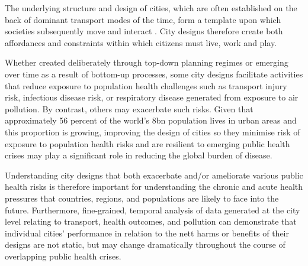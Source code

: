 \documentclass[preprint,12pt]{elsarticle}
\begin{document}
\begin{frontmatter}





\end{frontmatter}




The underlying structure and design of cities, which are often established on the back of dominant transport modes of the time, form a template upon which societies subsequently move and interact \cite{Thompson2020}. City designs therefore create both affordances and constraints within which citizens must live, work and play.

Whether created deliberately through top-down planning regimes \cite{mundigo1977city} or emerging over time as a result of bottom-up processes, some city designs facilitate activities that reduce exposure to population health challenges such as transport injury risk, infectious disease risk, or respiratory disease generated from exposure to air pollution. By contrast, others may exacerbate such risks. Given that approximately 56 percent of the world's 8bn population lives in urban areas and this proportion is growing, improving the design of cities so they minimise risk of exposure to population health risks and are resilient to emerging public health crises may play a significant role in reducing the global burden of disease.   

Understanding city designs that both exacerbate and/or ameliorate various public health risks is therefore important for understanding the chronic and acute health pressures that countries, regions, and populations are likely to face into the future. Furthermore, fine-grained, temporal analysis of data generated at the city level relating to transport, health outcomes, and pollution can demonstrate that individual cities' performance in relation to the nett harms or benefits of their designs are not static, but may change dramatically throughout the course of overlapping public health crises.
\end{document}
